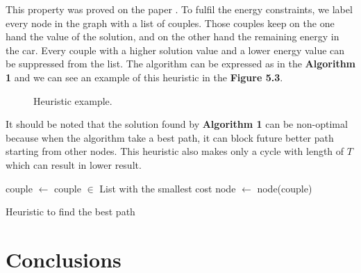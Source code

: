 \begin{bibunit}[ieeetr]
This property was proved on the paper \cite{carlier_optimization_2014b}.
To fulfil the energy constraints, we label every node in the graph with a list of couples.
Those couples keep on the one hand the value of the solution, and on the other hand the remaining energy in the car.
Every couple with a higher solution value and a lower energy value can be suppressed from the list.
The algorithm can be expressed as in the \textbf{Algorithm 1} and we can see an example of this heuristic in the \textbf{Figure 5.3}.

\begin{figure}[t]
\begin{center}
\scalebox{.9}{}
\end{center}
\caption{Heuristic example.}
\label{fig:heuristicExample}
\end{figure}

It should be noted that the solution found by \textbf{Algorithm 1} can be non-optimal because when the algorithm take a best path, it can block future better path starting from other nodes. 
This heuristic also makes only a cycle with length of $T$ which can result in lower result.

\begin{algorithm}
\DontPrintSemicolon %
 {
couple $\gets$ couple $\in$ List with the smallest cost\;
 node $\gets$ node(couple)\;
}
\caption{Heuristic to find the best path}
\label{algo:max}
\end{algorithm}

\section{Conclusions}

\end{bibunit}

